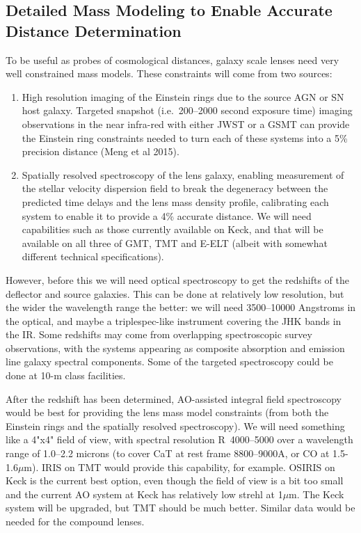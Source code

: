 \subsection{Detailed Mass Modeling to Enable Accurate Distance Determination}

To be useful as probes of cosmological distances, galaxy scale lenses
need very well constrained mass models. These constraints will come from
two sources:
\begin{enumerate}
    \item High resolution imaging of the Einstein rings due to the
    source AGN or SN host galaxy. Targeted snapshot (i.e.\ 200--2000
    second exposure time) imaging observations in the near infra-red
    with either JWST or a GSMT can provide the Einstein ring constraints
    needed to turn each of these systems into a  5\% precision distance
    (Meng et al 2015).
    \item Spatially resolved spectroscopy of the lens galaxy, enabling
    measurement of the stellar velocity dispersion field to break the
    degeneracy between the predicted time delays and the lens mass
    density profile, calibrating each system to enable it to provide a
    4\% accurate distance. We will need capabilities such as those
    currently available on Keck, and that will be available on all three
    of GMT, TMT and E-ELT (albeit with somewhat different technical
    specifications).
\end{enumerate}

However, before this we will need optical spectroscopy to get the
redshifts of the deflector and source galaxies. This can be done at
relatively low resolution, but the wider the wavelength range the
better: we will need 3500--10000 Angstroms in the optical, and maybe a
triplespec-like instrument covering the JHK bands in the IR. Some
redshifts may come from overlapping spectroscopic survey observations,
with the systems appearing as composite absorption and emission line
galaxy spectral components. Some of the targeted spectroscopy could be
done at 10-m class facilities.

After the redshift has been determined, AO-assisted integral field
spectroscopy would be best for providing the lens mass model constraints
(from both the Einstein rings and the spatially resolved spectroscopy).
We will need something like a 4"x4" field of view, with spectral
resolution R~4000--5000 over a wavelength range of 1.0--2.2 microns (to
cover CaT at rest frame  8800--9000A, or CO at 1.5-1.6$\mu$m). IRIS on
TMT would provide this capability, for example. OSIRIS on Keck is the
current best option, even though the field of view is a bit too small
and the current AO system at Keck has relatively low strehl at 1$\mu$m.
The Keck system will be upgraded, but TMT should be much better. Similar
data would be needed for the compound lenses.

